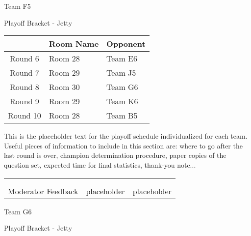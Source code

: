 \documentclass{article}%
\begin{document}
\newpage%
\begin{center}%
\begin{Huge}%
Team F5%
\end{Huge}%
\vspace*{12pt}%
\linebreak%
\begin{Large}%
Playoff Bracket {-} Jetty%
\end{Large}%
\end{center}%
\vspace*{4pt}%
%
\begin{tabularx}{\textwidth}{|c|Y|Y|}%
\hline%
&Room Name&Opponent\\%
\hline%
Round 6&Room 28&Team E6\\%
Round 7&Room 29&Team J5\\%
Round 8&Room 30&Team G6\\%
Round 9&Room 29&Team K6\\%
Round 10&Room 28&Team B5\\%
\hline%
\end{tabularx}%
\vspace*{30pt}%
\linebreak%
This is the placeholder text for the playoff schedule individualized for each team. Useful pieces of information to include in this section are: where to go after the last round is over, champion determination procedure, paper copies of the question set, expected time for final statistics, thank{-}you note...%
\vspace*{30pt}%
\newline%
%
\begin{tabularx}{\textwidth}{YYY}%
  &  &  \\%
\\%
Moderator Feedback&placeholder&placeholder\\%
\end{tabularx}%
\newpage%
\begin{center}%
\begin{Huge}%
Team G6%
\end{Huge}%
\vspace*{12pt}%
\linebreak%
\begin{Large}%
Playoff Bracket {-} Jetty%
\end{Large}%
\end{center}%
\end{document}
